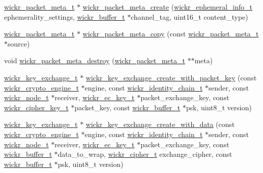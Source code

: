 \begin{DoxyCompactItemize}
\item 
\mbox{\hyperlink{structwickr__packet__meta}{wickr\+\_\+packet\+\_\+meta\+\_\+t}} $\ast$ \mbox{\hyperlink{group__wickr__protocol_ga146144d74da12c1fff766462fe7fa661}{wickr\+\_\+packet\+\_\+meta\+\_\+create}} (\mbox{\hyperlink{structwickr__ephemeral__info}{wickr\+\_\+ephemeral\+\_\+info\+\_\+t}} ephemerality\+\_\+settings, \mbox{\hyperlink{structwickr__buffer}{wickr\+\_\+buffer\+\_\+t}} $\ast$channel\+\_\+tag, uint16\+\_\+t content\+\_\+type)
\item 
\mbox{\hyperlink{structwickr__packet__meta}{wickr\+\_\+packet\+\_\+meta\+\_\+t}} $\ast$ \mbox{\hyperlink{group__wickr__protocol_ga1bb5a0f2a49069679b174b3e6521fe9b}{wickr\+\_\+packet\+\_\+meta\+\_\+copy}} (const \mbox{\hyperlink{structwickr__packet__meta}{wickr\+\_\+packet\+\_\+meta\+\_\+t}} $\ast$source)
\item 
void \mbox{\hyperlink{group__wickr__protocol_gad165ad670da761478cf5f8f91223c1d3}{wickr\+\_\+packet\+\_\+meta\+\_\+destroy}} (\mbox{\hyperlink{structwickr__packet__meta}{wickr\+\_\+packet\+\_\+meta\+\_\+t}} $\ast$$\ast$meta)
\item 
\mbox{\hyperlink{structwickr__key__exchange}{wickr\+\_\+key\+\_\+exchange\+\_\+t}} $\ast$ \mbox{\hyperlink{group__wickr__protocol_gac21e7b7fda1612923d83e7e75166209c}{wickr\+\_\+key\+\_\+exchange\+\_\+create\+\_\+with\+\_\+packet\+\_\+key}} (const \mbox{\hyperlink{structwickr__crypto__engine}{wickr\+\_\+crypto\+\_\+engine\+\_\+t}} $\ast$engine, const \mbox{\hyperlink{structwickr__identity__chain}{wickr\+\_\+identity\+\_\+chain\+\_\+t}} $\ast$sender, const \mbox{\hyperlink{structwickr__node}{wickr\+\_\+node\+\_\+t}} $\ast$receiver, \mbox{\hyperlink{structwickr__ec__key}{wickr\+\_\+ec\+\_\+key\+\_\+t}} $\ast$packet\+\_\+exchange\+\_\+key, const \mbox{\hyperlink{structwickr__cipher__key}{wickr\+\_\+cipher\+\_\+key\+\_\+t}} $\ast$packet\+\_\+key, const \mbox{\hyperlink{structwickr__buffer}{wickr\+\_\+buffer\+\_\+t}} $\ast$psk, uint8\+\_\+t version)
\item 
\mbox{\hyperlink{structwickr__key__exchange}{wickr\+\_\+key\+\_\+exchange\+\_\+t}} $\ast$ \mbox{\hyperlink{group__wickr__protocol_ga2b967bbdd161d8e37d19c4ab9621771b}{wickr\+\_\+key\+\_\+exchange\+\_\+create\+\_\+with\+\_\+data}} (const \mbox{\hyperlink{structwickr__crypto__engine}{wickr\+\_\+crypto\+\_\+engine\+\_\+t}} $\ast$engine, const \mbox{\hyperlink{structwickr__identity__chain}{wickr\+\_\+identity\+\_\+chain\+\_\+t}} $\ast$sender, const \mbox{\hyperlink{structwickr__node}{wickr\+\_\+node\+\_\+t}} $\ast$receiver, \mbox{\hyperlink{structwickr__ec__key}{wickr\+\_\+ec\+\_\+key\+\_\+t}} $\ast$packet\+\_\+exchange\+\_\+key, const \mbox{\hyperlink{structwickr__buffer}{wickr\+\_\+buffer\+\_\+t}} $\ast$data\+\_\+to\+\_\+wrap, \mbox{\hyperlink{structwickr__cipher}{wickr\+\_\+cipher\+\_\+t}} exchange\+\_\+cipher, const \mbox{\hyperlink{structwickr__buffer}{wickr\+\_\+buffer\+\_\+t}} $\ast$psk, uint8\+\_\+t version)
$$
\end{DoxyCompactItemize}
